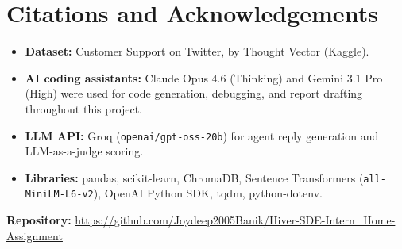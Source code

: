 \documentclass[11pt]{article}
\begin{document}
\section{Citations and Acknowledgements}

\begin{itemize}
  \item \textbf{Dataset:} Customer Support on Twitter, by Thought Vector (Kaggle).
  \item \textbf{AI coding assistants:} Claude Opus 4.6 (Thinking) and Gemini 3.1 Pro (High) were used for code generation, debugging, and report drafting throughout this project.
  \item \textbf{LLM API:} Groq (\texttt{openai/gpt-oss-20b}) for agent reply generation and LLM-as-a-judge scoring.
  \item \textbf{Libraries:} pandas, scikit-learn, ChromaDB, Sentence Transformers (\texttt{all-MiniLM-L6-v2}), OpenAI Python SDK, tqdm, python-dotenv.
\end{itemize}

\vspace{1em}
\noindent\textbf{Repository:} \url{https://github.com/Joydeep2005Banik/Hiver-SDE-Intern_Home-Assignment}
\end{document}
